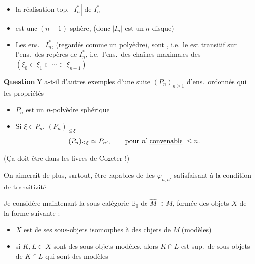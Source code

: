 \documentclass[11pt,a4paper]{article}
\begin{document}
\begin{itemize}
\item[\textbf{a}]  la réalisation top.\ $|I_n^*|$ de
$I_n^*$ \struck{\ill{}}
\item[\textbf{b}] \struck{\ill{}} est une $(n-1)$-sphère, (donc $|I_n|$ est un
$n$-disque)
\end{itemize}



\begin{itemize}
\item[\textbf{b}] Les ens.\  $I_n^*$, (regardés comme un \ill{}
polyèdre), sont , i.e.\ le \ill{} est transitif sur
l'ens.\ des repères de $I_n^*$, i.e.\ l'ens.\ des chaînes maximales des
$(\xi_0 \subset \xi_1 \subset \cdots \subset \xi_{n-1})$
\end{itemize}

\textbf{Question} \quad Y a-t-il d'autres exemples d'une suite
 $(P_n)_{n \geq 1}$
 d'ens.\ ordonnés
 qui \ill{} les propriétés

\begin{itemize}
\item[a)] $P_n$ est un $n$-polyèdre  sphérique
\item[b)] Si $\xi \in P_n$,  
$(P_n)_{\leq \xi}$ \struck{\ill{}} 
\[
(P_n)_{\leq \xi} \simeq P_{n'}, \qquad \text{pour } n' \text{ \uncertain{convenable} } \leq n.
\]
\end{itemize}

(Ça doit être dans les livres de Coxeter !)

On aimerait de plus, surtout, être capables de \struck{\ill{}} des
\struck{\ill{}} $\varphi_{n,n'}$ satisfaisant à la condition de transitivité.



Je considère maintenant la sous-catégorie $\mathbb{B}_0$ de
$\widehat{M} \supset M$, formée des objets $X$ de la forme suivante :

\begin{itemize}
\item $X$ est   de ses sous-objets isomorphes à des
objets de $M$ (modèles)
\item {} si $K, L \subset X$ sont des sous-objets modèles, alors
$K \cap L$ est sup.\ de sous-objets de $K \cap L$ qui sont des modèles
\end{itemize}
\end{document}
